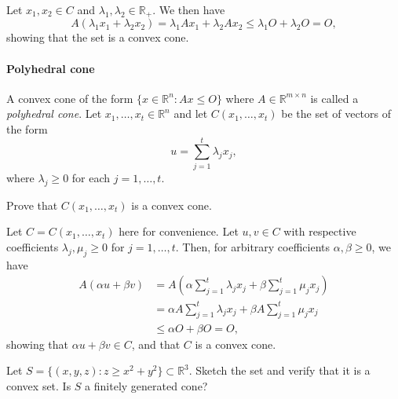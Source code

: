 \begin{solution}
  Let $x_1, x_2 \in C$ and $\lambda_1, \lambda_2 \in \mathbb{R}_+$.
  We then have
  \begin{equation}
    A(\lambda_1 x_1 + \lambda_2 x_2) = \lambda_1 Ax_1 + \lambda_2 Ax_2 \leq \lambda_1 O + \lambda_2 O = O,
  \end{equation}
  showing that the set is a convex cone.
\end{solution}

\paragraph{Polyhedral cone}
A convex cone of the form $\{x \in \mathbb{R}^n : Ax \leq O \}$ where $A \in \mathbb{R}^{m \times n}$ is called a \emph{polyhedral cone}.
Let $x_1, \ldots, x_t \in \mathbb{R}^n$ and let $C(x_1, \ldots, x_t)$ be the set of vectors of the form
\begin{equation}
  u = \sum_{j = 1}^{t} \lambda_j x_j,
\end{equation}
where $\lambda_j \geq 0$ for each $j = 1, \ldots, t$.

\begin{exercise}
  Prove that $C(x_1, \ldots, x_t)$ is a convex cone.
\end{exercise}

\begin{solution}
  Let $C = C(x_1, \ldots, x_t)$ here for convenience.
  Let $u, v \in C$ with respective coefficients $\lambda_j, \mu_j \geq 0$ for $j = 1, \ldots, t$.
  Then, for arbitrary coefficients $\alpha, \beta \geq 0$, we have
  \begin{equation}
    \begin{split}
      A(\alpha u + \beta v) &= A\left(\alpha \sum_{j=1}^{t} \lambda_j x_j + \beta \sum_{j=1}^{t} \mu_j x_j\right) \\
      &= \alpha A \sum_{j=1}^{t} \lambda_j x_j + \beta A \sum_{j=1}^{t} \mu_j x_j \\
      &\leq \alpha O + \beta O = O,
    \end{split}
  \end{equation}
  showing that $\alpha u + \beta v \in C$, and that $C$ is a convex cone.
\end{solution}

\begin{exercise}
  Let $S = \{ (x, y, z) : z \geq x^2 + y^2 \} \subset \mathbb{R}^3$.
  Sketch the set and verify that it is a convex set.
  Is $S$ a finitely generated cone?
\end{exercise}

